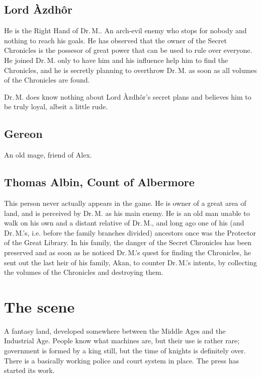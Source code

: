 \documentclass{gd-document}
\newcommand\DrM{Dr.\,M.\xspace}
\newcommand\Azdhor{Lord Àzdhôr\xspace}
\begin{document}
\subsection{\Azdhor}

He is the Right Hand of \DrM. An arch-evil enemy who stops for nobody
and nothing to reach his goals. He has observed that the owner of the
Secret Chronicles is the possesor of great power that can be used to
rule over everyone. He joined \DrM only to have him and his influence
help him to find the Chronicles, and he is secretly planning to
overthrow \DrM as soon as all volumes of the Chronicles are found.

\DrM does know nothing about \Azdhor’s secret plans and believes him
to be truly loyal, albeit a little rude.

\subsection{Gereon}

An old mage, friend of Alex.

\subsection{Thomas Albin, Count of Albermore}\label{sec:thomas}

This person never actually appears in the game. He is owner of a great
area of land, and is perceived by \DrM as his main enemy. He is an old
man unable to walk on his own and a distant relative of \DrM, and long
ago one of his (and \DrM’s, i.e. before the family branches divided)
ancestors once was the Protector of the Great Library. In his family,
the danger of the Secret Chronicles has been preserved and as soon as
he noticed \DrM’s quest for finding the Chronicles, he sent out the
last heir of his family, Akan, to counter \DrM’s intents, by
collecting the volumes of the Chronicles and destroying them.

\section{The scene}

A fantasy land, developed somewhere between the Middle Ages and the
Industrial Age. People know what machines are, but their use is rather
rare; government is formed by a king still, but the time of knights is
definitely over. There is a basically working police and court system
in place. The press has started its work.
\end{document}
